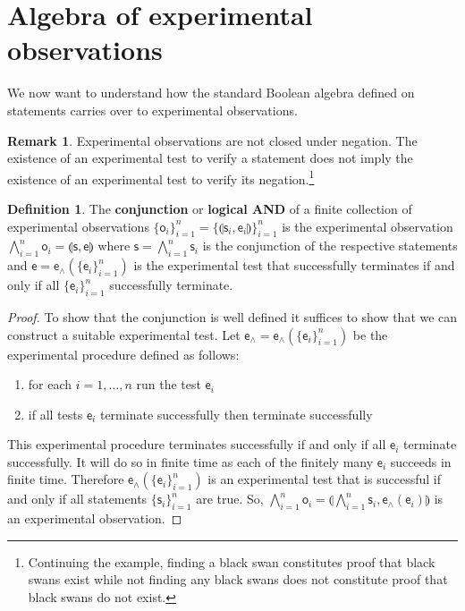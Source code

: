 \documentclass{amsart}
\theoremstyle{definition}
\newtheorem{defn}[thm]{Definition}
\newtheorem{rem}[thm]{Remark}
\numberwithin{equation}{section}
\begin{document}
\section{\bf Algebra of experimental observations}

We now want to understand how the standard Boolean algebra defined on statements carries over to experimental observations.

\begin{rem}
	Experimental observations are not closed under negation. The existence of an experimental test to verify a statement does not imply the existence of an experimental test to verify its negation.\footnote{Continuing the example, finding a black swan constitutes proof that black swans exist while not finding any black swans does not constitute proof that black swans do not exist.}
\end{rem}

\begin{defn}
	The \textbf{conjunction} or \textbf{logical AND} of a finite collection  of experimental observations $\{\mathsf{o}_i\}_{i=1}^{n}=\{\llparenthesis \mathsf{s}_i, \mathsf{e}_i\rrparenthesis\}_{i=1}^{n}$ is the experimental observation $\bigwedge\limits_{i=1}^{n} \mathsf{o}_i = \llparenthesis \mathsf{s}, \mathsf{e}\rrparenthesis$ where $\mathsf{s} = \bigwedge\limits_{i=1}^{n} \mathsf{s}_i$ is the conjunction of the respective statements and $\mathsf{e} = \mathsf{e}_\wedge(\{\mathsf{e}_i\}_{i=1}^{n})$ is the experimental test that successfully terminates if and only if all $\{\mathsf{e}_i\}_{i=1}^{n}$ successfully terminate.
\end{defn}

\begin{proof}
	To show that the conjunction is well defined it suffices to show that we can construct a suitable experimental test.  Let $\mathsf{e}_\wedge=\mathsf{e}_\wedge(\{\mathsf{e}_i\}_{i=1}^{n})$ be the experimental procedure defined as follows:
	\begin{enumerate}
	\item for each $i=1,\ldots,n$ run the test $\mathsf{e}_i$
	\item if all tests $\mathsf{e}_i$ terminate successfully then terminate successfully
	\end{enumerate}
	This experimental procedure terminates successfully if and only if all $\mathsf{e}_i$ terminate successfully. It will do so in finite time as each of the finitely many $\mathsf{e}_i$ succeeds in finite time. Therefore $\mathsf{e}_\wedge(\{\mathsf{e}_i\}_{i=1}^{n})$ is an experimental test that is successful if and only if all statements $\{\mathsf{s}_i\}_{i=1}^{n}$ are true. So, $\bigwedge\limits_{i=1}^{n} \mathsf{o}_i = \llparenthesis\bigwedge\limits_{i=1}^{n} \mathsf{s}_i, \mathsf{e}_{\wedge}(\mathsf{e}_i)\rrparenthesis$ is an experimental observation.
\end{proof}
\end{document}

